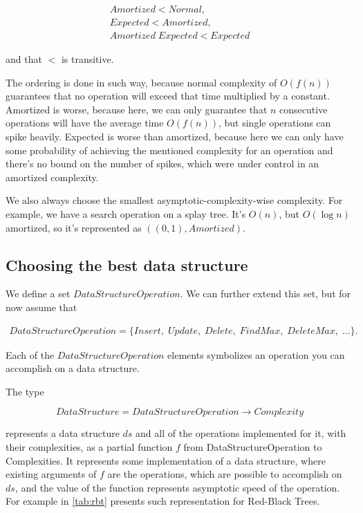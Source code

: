 \documentclass[a4paper,11pt]{article}
\begin{document}
		\begin{eqnarray}
			Amortized < Normal,\\
			Expected < Amortized,\\
			Amortized \; Expected < Expected
		\end{eqnarray}

		and that $<$ is transitive.

		The ordering is done in such way, because normal complexity of $O(f(n))$ guarantees that no operation
		will exceed that time multiplied by a constant. Amortized is worse, because here, we can only guarantee
		that $n$ consecutive operations will have the average time $O(f(n))$, but single operations can spike
		heavily. Expected is worse than amortized, because here we can only have some probability of achieving
		the mentioned complexity for an operation and there's no bound on the number of spikes, which were under
		control in an amortized complexity.

		We also always choose the smallest asymptotic-complexity-wise complexity.  For example, we have a search
		operation on a splay tree. It's $O(n)$, but $O(\log n)$ amortized, so it's represented as
		$((0,1),Amortized)$.

	\subsection{Choosing the best data structure} \label{sec:choose-ds}

		We define a set $DataStructureOperation$. We can further extend this set, but for now assume that

		\begin{eqnarray}
			DataStructureOperation = \{Insert, \; Update, \; Delete, \; FindMax,\; DeleteMax, \; \dots\}.
		\end{eqnarray}

		Each of the $DataStructureOperation$ elements symbolizes an operation you can accomplish on a data
		structure.

		The type

		\begin{equation}\label{data-structure-type}
			DataStructure = DataStructureOperation \rightarrow Complexity
		\end{equation}

		represents a data structure $ds$ and all of the operations implemented for it, with their complexities, as a
		partial function $f$ from DataStructureOperation to Complexities. It represents some implementation of a
		data structure, where existing arguments of $f$ are the operations, which are possible to accomplish on
		$ds$, and the value of the function represents asymptotic speed of the operation. For example in
		\autoref{tab:rbt} presents such representation for Red-Black Trees.
\end{document}
